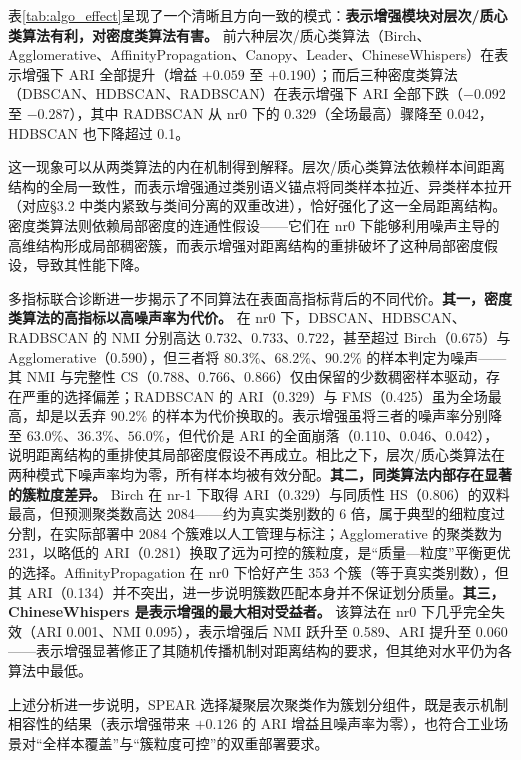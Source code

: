\documentclass[10.5pt,compsoc,UTF8]{CjC}
\theoremstyle{mystyle}
\begin{document}
表\ref{tab:algo_effect}呈现了一个清晰且方向一致的模式：\textbf{表示增强模块对层次/质心类算法有利，对密度类算法有害。} 前六种层次/质心类算法（Birch、Agglomerative、AffinityPropagation、Canopy、Leader、ChineseWhispers）在表示增强下 ARI 全部提升（增益 $+0.059$ 至 $+0.190$）；而后三种密度类算法（DBSCAN、HDBSCAN、RADBSCAN）在表示增强下 ARI 全部下跌（$-0.092$ 至 $-0.287$），其中 RADBSCAN 从 nr0 下的 0.329（全场最高）骤降至 0.042，HDBSCAN 也下降超过 0.1。

这一现象可以从两类算法的内在机制得到解释。层次/质心类算法依赖样本间距离结构的全局一致性，而表示增强通过类别语义锚点将同类样本拉近、异类样本拉开（对应\S 3.2 中类内紧致与类间分离的双重改进），恰好强化了这一全局距离结构。密度类算法则依赖局部密度的连通性假设——它们在 nr0 下能够利用噪声主导的高维结构形成局部稠密簇，而表示增强对距离结构的重排破坏了这种局部密度假设，导致其性能下降。

多指标联合诊断进一步揭示了不同算法在表面高指标背后的不同代价。\textbf{其一，密度类算法的高指标以高噪声率为代价。} 在 nr0 下，DBSCAN、HDBSCAN、RADBSCAN 的 NMI 分别高达 0.732、0.733、0.722，甚至超过 Birch（0.675）与 Agglomerative（0.590），但三者将 $80.3\%$、$68.2\%$、$90.2\%$ 的样本判定为噪声——其 NMI 与完整性 CS（0.788、0.766、0.866）仅由保留的少数稠密样本驱动，存在严重的选择偏差；RADBSCAN 的 ARI（0.329）与 FMS（0.425）虽为全场最高，却是以丢弃 $90.2\%$ 的样本为代价换取的。表示增强虽将三者的噪声率分别降至 $63.0\%$、$36.3\%$、$56.0\%$，但代价是 ARI 的全面崩落（0.110、0.046、0.042），说明距离结构的重排使其局部密度假设不再成立。相比之下，层次/质心类算法在两种模式下噪声率均为零，所有样本均被有效分配。\textbf{其二，同类算法内部存在显著的簇粒度差异。} Birch 在 nr-1 下取得 ARI（0.329）与同质性 HS（0.806）的双料最高，但预测聚类数高达 2084——约为真实类别数的 6 倍，属于典型的细粒度过分割，在实际部署中 2084 个簇难以人工管理与标注；Agglomerative 的聚类数为 231，以略低的 ARI（0.281）换取了远为可控的簇粒度，是``质量—粒度''平衡更优的选择。AffinityPropagation 在 nr0 下恰好产生 353 个簇（等于真实类别数），但其 ARI（0.134）并不突出，进一步说明簇数匹配本身并不保证划分质量。\textbf{其三，ChineseWhispers 是表示增强的最大相对受益者。} 该算法在 nr0 下几乎完全失效（ARI 0.001、NMI 0.095），表示增强后 NMI 跃升至 0.589、ARI 提升至 0.060——表示增强显著修正了其随机传播机制对距离结构的要求，但其绝对水平仍为各算法中最低。

上述分析进一步说明，SPEAR 选择凝聚层次聚类作为簇划分组件，既是表示机制相容性的结果（表示增强带来 $+0.126$ 的 ARI 增益且噪声率为零），也符合工业场景对``全样本覆盖''与``簇粒度可控''的双重部署要求。
\end{document}
